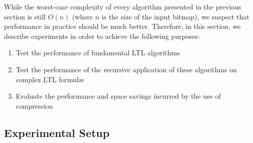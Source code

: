While the worst-case complexity of every algorithm presented in the previous section is still $O(n)$ (where $n$ is the size of the input bitmap), we suspect that performance in practice should be much better. Therefore, in this section, we describe experiments in order to achieve the following purposes:

\begin{enumerate}
\item Test the performance of fundamental LTL algorithms
\item Test the performance of the recursive application of these algorithms on complex LTL formul\ae{}
\item Evaluate the performance and space savings incurred by the use of compression
\end{enumerate}

\begin{comment}
\subsection{Modifications to Libraries} %

Section \ref{sec:bm:ltlbitmap} mentions that the time and space complexities of all LTL operators are $O(n)$ where $n$ is the size of the input uncompressed bitmap. After applying RLE-model bitmap compression algorithms to our solution, the space complexities become $O(m)$ as is discussed above, and we managed to make the time complexities also become $O(m)$ by implementing the bitmap manipulation functions listed in Table \ref{tbl:bm:bmhelpers} for every  bitmap compression algorithms.

Because of lack of the support of random access for the RLE-model bitmap compression algorithms, we cannot enumerate the bits in the same way as uncompressed bitmap. Therefore we design an \emph{iterator} data structure to store not only the absolute index of current bit in the uncompressed bitmap but also the relative index in the compressed bitmap.

Taking the function \textbf{next(1, )} as an example, if the current relative index is in a sequence word of 0, the search in this word is unnecessary, and we just jump to the next word; if the index is in a sequence word of 1, we return the current index; however, if the index is in a literal word, we have to look for the bit 1 in the $ulen$-bits word.

\end{comment}

\subsection{Experimental Setup} %

